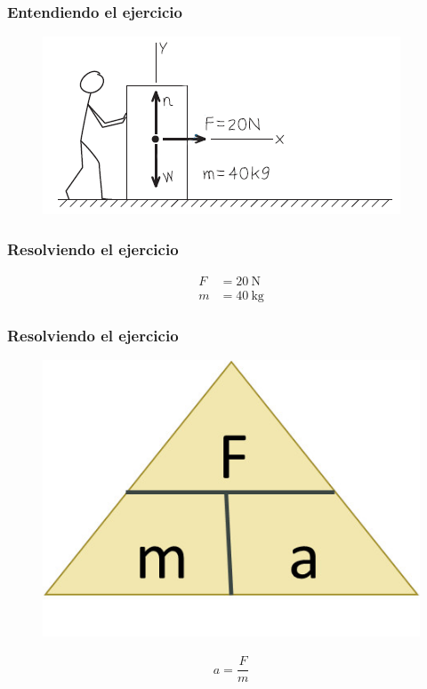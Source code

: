 \documentclass[14pt]{beamer}
\begin{document}
\begin{frame}
\frametitle{Entendiendo el ejercicio}
\begin{figure}
    \centering
    \includegraphics[scale=1]{Imagenes/Newton_02.png}
\end{figure}
\end{frame}
\begin{frame}
\frametitle{Resolviendo el ejercicio}
\pause
\begin{align*}
F &= \SI{20}{\newton} \\[0.5em]
m &= \SI{40}{\kilo\gram}
\end{align*}
\end{frame}
\begin{frame}
\frametitle{Resolviendo el ejercicio}
\pause
\begin{figure}
    \centering
    \includegraphics[scale=1]{Imagenes/Newton_11.jpg}
\end{figure}
\pause
\begin{align*}
a = \dfrac{F}{m}
\end{align*}
\end{frame}
\end{document}
